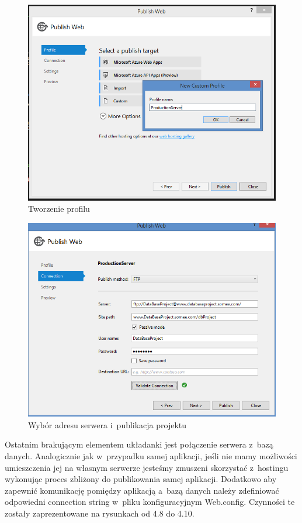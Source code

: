 \documentclass[a4paper,11pt]{article}
\begin{document}
\begin{figure}[H]
	\centering
	\includegraphics[width=\textwidth,height=0.4\textheight]{vs2.png}
	\caption{Tworzenie profilu}
\end{figure}
\begin{figure}[H]
	\centering
	\includegraphics[width=\textwidth,height=0.4\textheight]{vs3.png}
	\caption{Wybór adresu serwera i~publikacja projektu}
\end{figure}
Ostatnim brakującym elementem układanki jest połączenie serwera z~bazą danych. Analogicznie jak w~przypadku samej aplikacji, jeśli nie mamy możliwości umieszczenia jej na własnym serwerze jesteśmy zmuszeni skorzystać z~hostingu wykonując proces zbliżony do publikowania samej aplikacji. Dodatkowo aby zapewnić komunikację pomiędzy aplikacją a~bazą danych należy zdefiniować odpowiedni connection string w~pliku konfiguracyjnym Web.config. Czynności te zostały zaprezentowane na rysunkach od 4.8 do 4.10.
\end{document}
